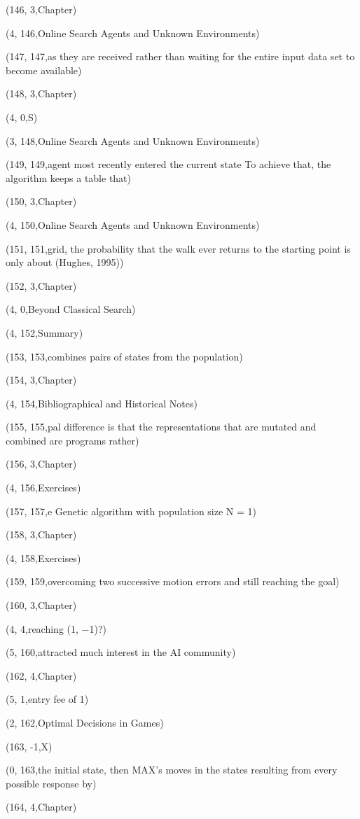 (146, 3,Chapter)

(4, 146,Online Search Agents and Unknown Environments)

(147, 147,as they are received rather than waiting for the entire input data set to become available)

(148, 3,Chapter)

(4, 0,S)

(3, 148,Online Search Agents and Unknown Environments)

(149, 149,agent most recently entered the current state To achieve that, the algorithm keeps a table that)

(150, 3,Chapter)

(4, 150,Online Search Agents and Unknown Environments)

(151, 151,grid, the probability that the walk ever returns to the starting point is only about  (Hughes, 1995))

(152, 3,Chapter)

(4, 0,Beyond Classical Search)

(4, 152,Summary)

(153, 153,combines pairs of states from the population)

(154, 3,Chapter)

(4, 154,Bibliographical and Historical Notes)

(155, 155,pal difference is that the representations that are mutated and combined are programs rather)

(156, 3,Chapter)

(4, 156,Exercises)

(157, 157,e Genetic algorithm with population size N = 1)

(158, 3,Chapter)

(4, 158,Exercises)

(159, 159,overcoming two successive motion errors and still reaching the goal)

(160, 3,Chapter)

(4, 4,reaching (1, −1)?)

(5, 160,attracted much interest in the AI community)

(162, 4,Chapter)

(5, 1,entry fee of 1)

(2, 162,Optimal Decisions in Games)

(163, -1,X)

(0, 163,the initial state, then MAX’s moves in the states resulting from every possible response by)

(164, 4,Chapter)

